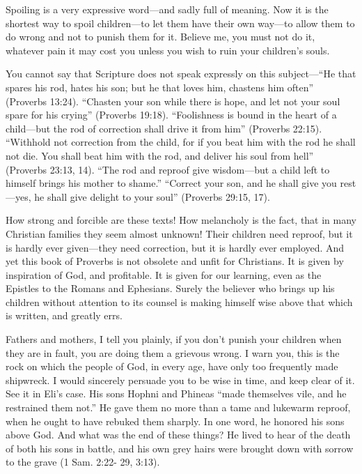 \documentclass[
]{book}
\begin{document}
Spoiling is a very expressive word---and sadly full of meaning. Now it is the shortest way to spoil children---to let them have their own way---to allow them to do wrong and not to punish them for it. Believe me, you must not do it, whatever pain it may cost you unless you wish to ruin your children's souls.

You cannot say that Scripture does not speak expressly on this subject---``He that spares his rod, hates his son; but he that loves him, chastens him often'' (Proverbs 13:24). ``Chasten your son while there is hope, and let not your soul spare for his crying'' (Proverbs 19:18). ``Foolishness is bound in the heart of a child---but the rod of correction shall drive it from him'' (Proverbs 22:15). ``Withhold not correction from the child, for if you beat him with the rod he shall not die. You shall beat him with the rod, and deliver his soul from hell'' (Proverbs 23:13, 14). ``The rod and reproof give wisdom---but a child left to himself brings his mother to shame.'' ``Correct your son, and he shall give you rest---yes, he shall give delight to your soul'' (Proverbs 29:15, 17).

How strong and forcible are these texts! How melancholy is the fact, that in many Christian families they seem almost unknown! Their children need reproof, but it is hardly ever given---they need correction, but it is hardly ever employed. And yet this book of Proverbs is not obsolete and unfit for Christians. It is given by inspiration of God, and profitable. It is given for our learning, even as the Epistles to the Romans and Ephesians. Surely the believer who brings up his children without attention to its counsel is making himself wise above that which is written, and greatly errs.

Fathers and mothers, I tell you plainly, if you don't punish your children when they are in fault, you are doing them a grievous wrong. I warn you, this is the rock on which the people of God, in every age, have only too frequently made shipwreck. I would sincerely persuade you to be wise in time, and keep clear of it. See it in Eli's case. His sons Hophni and Phineas ``made themselves vile, and he restrained them not.'' He gave them no more than a tame and lukewarm reproof, when he ought to have rebuked them sharply. In one word, he honored his sons above God. And what was the end of these things? He lived to hear of the death of both his sons in battle, and his own grey hairs were brought down with sorrow to the grave (1 Sam. 2:22- 29, 3:13).
\end{document}
